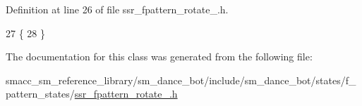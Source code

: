 Definition at line 26 of file ssr\+\_\+fpattern\+\_\+rotate\+\_.\+h.


\begin{DoxyCode}
27   \{
28   \}
\end{DoxyCode}


The documentation for this class was generated from the following file\+:\begin{DoxyCompactItemize}
\item 
smacc\+\_\+sm\+\_\+reference\+\_\+library/sm\+\_\+dance\+\_\+bot/include/sm\+\_\+dance\+\_\+bot/states/f\+\_\+pattern\+\_\+states/\hyperlink{ssr__fpattern__rotate__2_8h}{ssr\+\_\+fpattern\+\_\+rotate\+\_.\+h}\end{DoxyCompactItemize}
